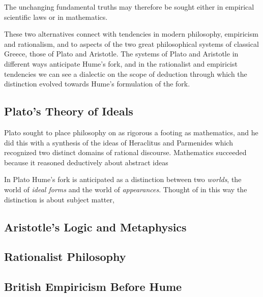 The unchanging fundamental truths may therefore be sought either in empirical
scientific laws or in mathematics.

These two alternatives connect with tendencies in modern philosophy,
empiricism and rationalism, and to aspects of the two great
philosophical systems of classical Greece, those of Plato and Aristotle.
The systems of Plato and Aristotle in different ways anticipate Hume's
fork, and in the rationalist and empiricist tendencies we can see a
dialectic on the scope of deduction through which the distinction
evolved towards Hume's formulation of the fork. 

\subsection{Plato's Theory of Ideals}

Plato sought to place philosophy on as rigorous a footing as
mathematics, and he did this with a synthesis of the ideas of
Heraclitus and Parmenides which recognized two distinct domains of
rational discourse.
Mathematics succeeded because it reasoned deductively about abstract ideas


In Plato Hume's fork is anticipated as a distinction between two \emph{worlds}, the world of \emph{ideal forms} and the world of \emph{appearances}.
Thought of in this way the distinction is about subject matter, 






\subsection{Aristotle's Logic and Metaphysics}


\subsection{Rationalist Philosophy}

\subsection{British Empiricism Before Hume}

